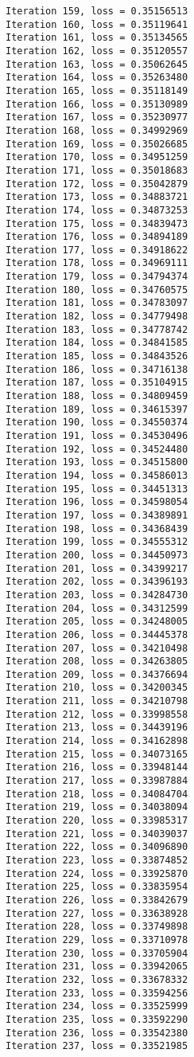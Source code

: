 \documentclass[11pt]{article}
\begin{document}
\begin{Verbatim}[commandchars=\\\{\}]
Iteration 159, loss = 0.35156513
Iteration 160, loss = 0.35119641
Iteration 161, loss = 0.35134565
Iteration 162, loss = 0.35120557
Iteration 163, loss = 0.35062645
Iteration 164, loss = 0.35263480
Iteration 165, loss = 0.35118149
Iteration 166, loss = 0.35130989
Iteration 167, loss = 0.35230977
Iteration 168, loss = 0.34992969
Iteration 169, loss = 0.35026685
Iteration 170, loss = 0.34951259
Iteration 171, loss = 0.35018683
Iteration 172, loss = 0.35042879
Iteration 173, loss = 0.34883721
Iteration 174, loss = 0.34873253
Iteration 175, loss = 0.34839473
Iteration 176, loss = 0.34894189
Iteration 177, loss = 0.34918622
Iteration 178, loss = 0.34969111
Iteration 179, loss = 0.34794374
Iteration 180, loss = 0.34760575
Iteration 181, loss = 0.34783097
Iteration 182, loss = 0.34779498
Iteration 183, loss = 0.34778742
Iteration 184, loss = 0.34841585
Iteration 185, loss = 0.34843526
Iteration 186, loss = 0.34716138
Iteration 187, loss = 0.35104915
Iteration 188, loss = 0.34809459
Iteration 189, loss = 0.34615397
Iteration 190, loss = 0.34550374
Iteration 191, loss = 0.34530496
Iteration 192, loss = 0.34524480
Iteration 193, loss = 0.34515800
Iteration 194, loss = 0.34586013
Iteration 195, loss = 0.34451313
Iteration 196, loss = 0.34598054
Iteration 197, loss = 0.34389891
Iteration 198, loss = 0.34368439
Iteration 199, loss = 0.34555312
Iteration 200, loss = 0.34450973
Iteration 201, loss = 0.34399217
Iteration 202, loss = 0.34396193
Iteration 203, loss = 0.34284730
Iteration 204, loss = 0.34312599
Iteration 205, loss = 0.34248005
Iteration 206, loss = 0.34445378
Iteration 207, loss = 0.34210498
Iteration 208, loss = 0.34263805
Iteration 209, loss = 0.34376694
Iteration 210, loss = 0.34200345
Iteration 211, loss = 0.34210798
Iteration 212, loss = 0.33998558
Iteration 213, loss = 0.34439196
Iteration 214, loss = 0.34162898
Iteration 215, loss = 0.34073165
Iteration 216, loss = 0.33948144
Iteration 217, loss = 0.33987884
Iteration 218, loss = 0.34084704
Iteration 219, loss = 0.34038094
Iteration 220, loss = 0.33985317
Iteration 221, loss = 0.34039037
Iteration 222, loss = 0.34096890
Iteration 223, loss = 0.33874852
Iteration 224, loss = 0.33925870
Iteration 225, loss = 0.33835954
Iteration 226, loss = 0.33842679
Iteration 227, loss = 0.33638928
Iteration 228, loss = 0.33749898
Iteration 229, loss = 0.33710978
Iteration 230, loss = 0.33705904
Iteration 231, loss = 0.33942065
Iteration 232, loss = 0.33678332
Iteration 233, loss = 0.33594256
Iteration 234, loss = 0.33525999
Iteration 235, loss = 0.33592290
Iteration 236, loss = 0.33542380
Iteration 237, loss = 0.33521985

\end{Verbatim}
\end{document}
